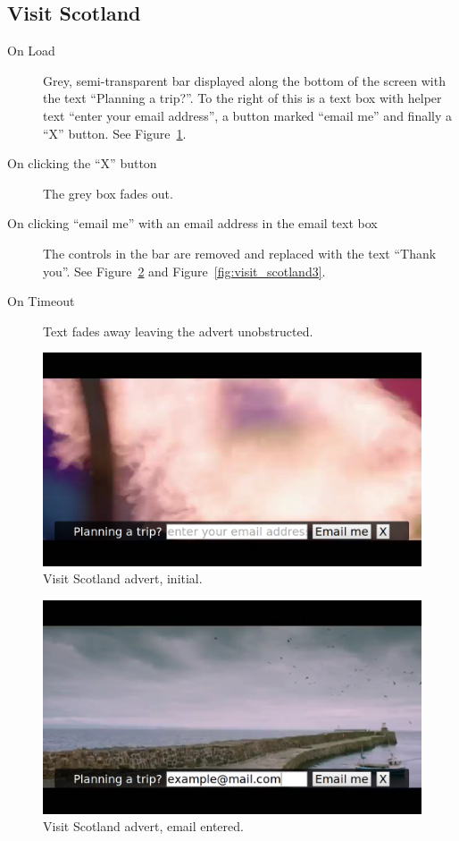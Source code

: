 \subsection{Visit Scotland}
	\begin{description}
		\item[On Load]{Grey, semi-transparent bar displayed along the bottom of the screen with the text ``Planning a trip?''. To the right of this is a text box with helper text ``enter your email address'', a button marked ``email me'' and finally a ``X'' button. See Figure~\ref{fig:visit_scotland1}.}
		\item[On clicking the ``X'' button]{The grey box fades out.}
		\item[On clicking ``email me'' with an email address in the email text box]{The controls in the bar are removed and replaced with the text ``Thank you''. See Figure~\ref{fig:visit_scotland2} and Figure~\ref{fig:visit_scotland3}.}
		\item[On Timeout]{Text fades away leaving the advert unobstructed.}
	\end{description}

	\begin{figure}[th]
		\centering
		\includegraphics[width=\textwidth,height=0.5\textheight,keepaspectratio]{images/adverts/visit_scotland-1.png}
		\caption{Visit Scotland advert, initial.}
		\label{fig:visit_scotland1}
	\end{figure}

	\begin{figure}[th]
		\centering
		\includegraphics[width=\textwidth,height=0.5\textheight,keepaspectratio]{images/adverts/visit_scotland-2.png}
		\caption{Visit Scotland advert, email entered.}
		\label{fig:visit_scotland2}
	\end{figure}

